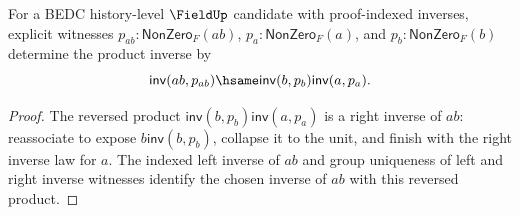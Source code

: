 \begin{theorem}
\label{thm:field-inverse-product-reverse-from-apartness}
For a BEDC history-level $\FieldUp$ candidate with proof-indexed inverses,
explicit witnesses $p_{ab}:\mathsf{NonZero}_F(ab)$,
$p_a:\mathsf{NonZero}_F(a)$, and $p_b:\mathsf{NonZero}_F(b)$ determine
the product inverse by
$$
\mathsf{inv}(ab,p_{ab})\hsame \mathsf{inv}(b,p_b)\mathsf{inv}(a,p_a).
$$
\end{theorem}
\begin{proof}
The reversed product $\mathsf{inv}(b,p_b)\mathsf{inv}(a,p_a)$ is a right
inverse of $ab$: reassociate to expose $b\mathsf{inv}(b,p_b)$, collapse it
to the unit, and finish with the right inverse law for $a$. The indexed left
inverse of $ab$ and group uniqueness of left and right inverse witnesses
identify the chosen inverse of $ab$ with this reversed product.
\end{proof}

